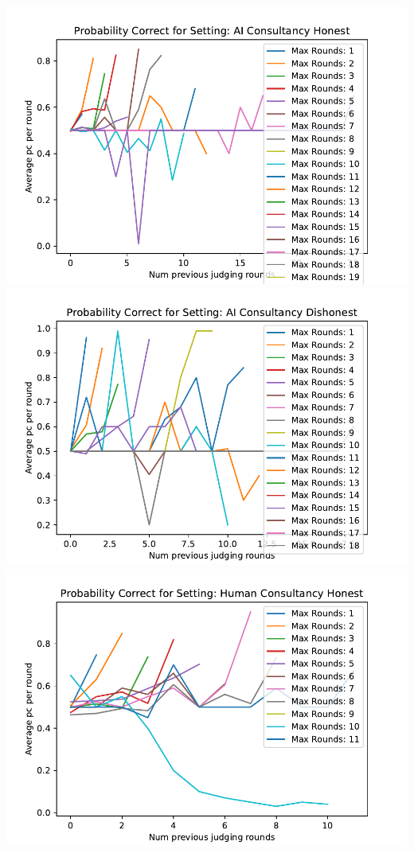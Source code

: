 \documentclass[
]{article}
\begin{document}
\includegraphics[width=1\linewidth]{debate-2309_files/figure-latex/strat-4}
\includegraphics[width=1\linewidth]{debate-2309_files/figure-latex/strat-5}
\includegraphics[width=1\linewidth]{debate-2309_files/figure-latex/strat-6}
\end{document}
